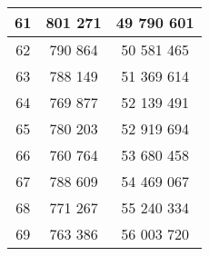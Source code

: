\begin{center}
\begin{tabular}{|c|c|c|}
          61  &  801 271  &  49 790 601 \\ \hline
          62  &  790 864  &  50 581 465 \\ \hline
          63  &  788 149  &  51 369 614 \\ \hline
          64  &  769 877  &  52 139 491 \\ \hline
          65  &  780 203  &  52 919 694 \\ \hline
          66  &  760 764  &  53 680 458 \\ \hline
          67  &  788 609  &  54 469 067 \\ \hline
          68  &  771 267  &  55 240 334 \\ \hline
          69  &  763 386  &  56 003 720 \\ \hline
     \end{tabular}
\end{center}
\newpage
